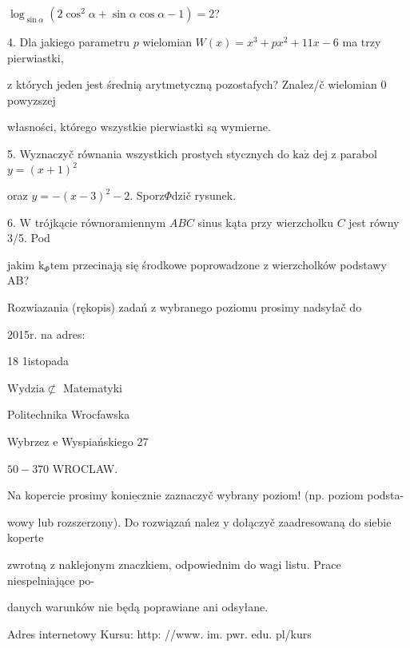 \documentclass[a4paper,12pt]{article}
\begin{document}
$\log_{\sin\alpha}(2\cos^{2}\alpha+\sin\alpha\cos\alpha-1)=2$?

4. Dla jakiego parametru $p$ wielomian $W(x) = x^{3}+px^{2}+11x-6$ ma trzy pierwiastki,

$\mathrm{z}$ których jeden jest średnią arytmetyczną pozostafych? Znalez/č wielomian $0$ powyzszej

własności, którego wszystkie pierwiastki są wymierne.

5. Wyznaczyč równania wszystkich prostych stycznych do $\mathrm{k}\mathrm{a}\dot{\mathrm{z}}$ dej $\mathrm{z}$ parabol $y=(x+1)^{2}$

oraz $y=-(x-3)^{2}-2$. Sporz$\Phi$dzič rysunek.

6. $\mathrm{W}$ trójkącie równoramiennym $ABC$ sinus kąta przy wierzcholku $C$ jest równy 3/5. Pod

jakim $\mathrm{k}_{\Phi}\mathrm{t}\mathrm{e}\mathrm{m}$ przecinają się środkowe poprowadzone $\mathrm{z}$ wierzcholków podstawy AB?

Rozwiazania (rękopis) zadań z wybranego poziomu prosimy nadsyłač do

2015r. na adres:

18 1istopada

$\mathrm{W}\mathrm{y}\mathrm{d}\mathrm{z}\mathrm{i}\mathrm{a}\not\subset$ Matematyki

Politechnika Wrocfawska

Wybrzez $\mathrm{e}$ Wyspiańskiego 27

$50-370$ WROCLAW.

Na kopercie prosimy $\underline{\mathrm{k}\mathrm{o}\mathrm{n}\mathrm{i}\mathrm{e}\mathrm{c}\mathrm{z}\mathrm{n}\mathrm{i}\mathrm{e}}$ zaznaczyč wybrany poziom! (np. poziom podsta-

wowy lub rozszerzony). Do rozwiązań nalez $\mathrm{y}$ dołączyč zaadresowaną do siebie koperte

zwrotną $\mathrm{z}$ naklejonym znaczkiem, odpowiednim do wagi listu. Prace niespelniające po-

danych warunków nie będą poprawiane ani odsyłane.

Adres internetowy Kursu: http: //www. im. pwr. edu. pl/kurs
\end{document}
